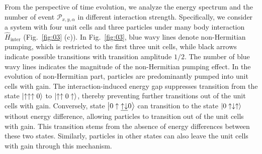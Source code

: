 \documentclass[longbibliography, aps, prx, amsmath, amssymb, amsfonts, twocolumn,superscriptaddress, footinbib]{revtex4-1}
\begin{document}
	From the perspective of time evolution, we analyze the energy spectrum and the number of event $\mathcal{P}_{x,y,\alpha}$ in different interaction strength. Specifically, we consider a system with four unit cells and three particles under many body interaction $\hat{H}_{\text{inter}}$ (Fig.~\ref{fig:03} (c)). 
	In Fig.~\ref{fig:03}, blue wavy lines denote non-Hermitian pumping, which is restricted to the first three unit cells, while black arrows indicate possible transitions with transition amplitude $1/2$. The number of blue wavy lines indicates the magnitude of the non-Hermitian pumping effect.
	In the evolution of non-Hermitian part, particles are predominantly pumped into unit cells with gain. The interaction-induced energy gap suppresses transition from the state $\ket{\uparrow\uparrow\uparrow0}$ to $\ket{\uparrow\uparrow0\uparrow}$, thereby preventing further transitions out of the unit cells with gain. 
	Conversely, state $\ket{0\uparrow\underline{\uparrow\downarrow}0}$ can transition to the state $\ket{0\uparrow\downarrow\uparrow}$ without energy difference, allowing particles to transition out of the unit cells with gain. This transition stems from the absence of energy differences between these two states. Similarly, particles in other states can also leave the unit cells with gain through this mechanism.
\end{document}
